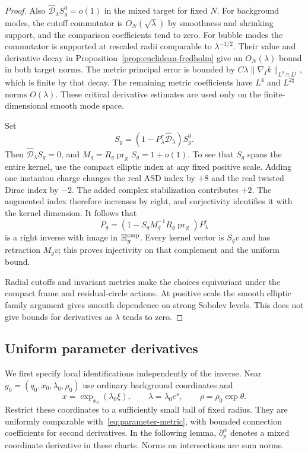 \documentclass[11pt]{amsart}
\theoremstyle{definition}
\theoremstyle{remark}
\theoremstyle{plain}
\begin{document}
\begin{proof}
Also $\widehat{\mathscr D}_\lambda S_g^0=o(1)$ in the mixed target
for fixed $N$.  For background modes, the cutoff commutator is
$O_N(\sqrt\lambda)$ by smoothness and shrinking support, and the
comparison coefficients tend to zero.  For bubble modes the commutator
is supported at rescaled radii comparable to $\lambda^{-1/2}$.
Their value and derivative decay in
Proposition~\ref{prop:euclidean-fredholm} give an $O_N(\lambda)$
bound in both target norms.  The metric principal error is bounded by
$C\lambda\|\nabla_Ik\|_{L^2\cap L^\sharp}$, which is finite by that
decay.  The remaining metric coefficients have $L^4$ and
$L^{2\sharp}$ norms $O(\lambda)$.  These critical derivative estimates
are used only on the finite-dimensional smooth mode space.

Set
\begin{equation}\label{eq:corrected-kernel-synthesis}
 S_g=(1-P^r_\lambda\widehat{\mathscr D}_\lambda)S_g^0.
\end{equation}
Then $\widehat{\mathscr D}_\lambda S_g=0$, and
$M_g=R_g\operatorname{pr}_{\mathbb X}S_g=1+o(1)$.
To see that $S_g$ spans the entire kernel, use the compact elliptic
index at any fixed positive scale.  Adding one instanton charge
changes the real ASD index by $+8$ and the real twisted Dirac index
by $-2$.  The added complex stabilization contributes $+2$.
The augmented index therefore increases by eight, and surjectivity
identifies it with the kernel dimension.  It follows that
\begin{equation}\label{eq:complemented-euclidean-inverse}
 P_g=(1-S_gM_g^{-1}R_g\operatorname{pr}_{\mathbb X})P^r_\lambda
\end{equation}
is a right inverse with image in $\mathbb H_g^{\rm cmp}$.
Every kernel vector is $S_gv$ and has retraction $M_gv$;
this proves injectivity on that complement and the uniform bound.

Radial cutoffs and invariant metrics make the choices equivariant
under the compact frame and residual-circle actions.  At positive
scale the smooth elliptic family argument gives smooth dependence
on strong Sobolev levels.  This does not give bounds for derivatives
as $\lambda$ tends to zero.
\end{proof}

\subsection{Uniform parameter derivatives}
We first specify local identifications independently of the inverse.
Near $g_0=(q_0,x_0,\lambda_0,\rho_0)$ use ordinary background coordinates
and
\begin{equation}\label{eq:normalized-parameter-charts}
 x=\exp_{x_0}(\lambda_0\xi),\qquad
 \lambda=\lambda_0e^s,\qquad \rho=\rho_0\exp\theta.
\end{equation}
Restrict these coordinates to a sufficiently small ball of fixed radius.
They are uniformly comparable with~\eqref{eq:parameter-metric}, with
bounded connection coefficients for second derivatives.  In the following
lemma, $\partial_p^\alpha$ denotes a mixed coordinate derivative in
these charts.  Norms on intersections are sum norms.
\end{document}
